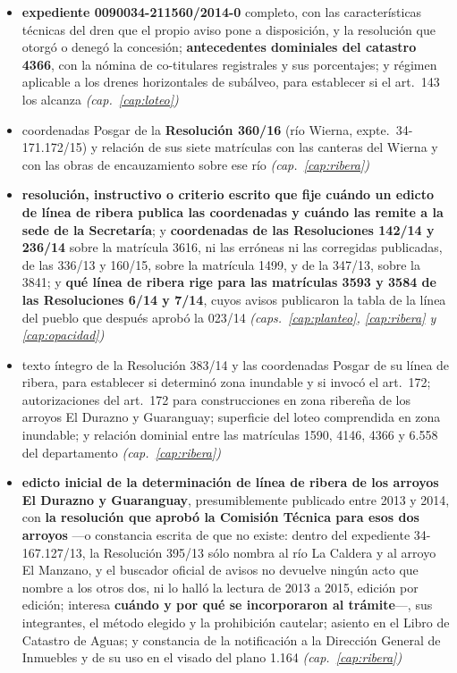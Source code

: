 \begin{itemize}[leftmargin=*]
\item \textbf{expediente 0090034-211560/2014-0} completo, con las características técnicas del dren que el propio aviso pone a disposición, y la resolución que otorgó o denegó la concesión; \textbf{antecedentes dominiales del catastro 4366}, con la nómina de co-titulares registrales y sus porcentajes; y régimen aplicable a los drenes horizontales de subálveo, para establecer si el art.\ 143 los alcanza \textit{(cap.\ \ref{cap:loteo})}
\item coordenadas Posgar de la \textbf{Resolución 360/16} (río Wierna, expte.\ 34-171.172/15) y relación de sus siete matrículas con las canteras del Wierna y con las obras de encauzamiento sobre ese río \textit{(cap.\ \ref{cap:ribera})}
\item \textbf{resolución, instructivo o criterio escrito que fije cuándo un edicto de línea de ribera publica las coordenadas y cuándo las remite a la sede de la Secretaría}; y \textbf{coordenadas de las Resoluciones 142/14 y 236/14} sobre la matrícula 3616, ni las erróneas ni las corregidas publicadas, de las 336/13 y 160/15, sobre la matrícula 1499, y de la 347/13, sobre la 3841; y \textbf{qué línea de ribera rige para las matrículas 3593 y 3584 de las Resoluciones 6/14 y 7/14}, cuyos avisos publicaron la tabla de la línea del pueblo que después aprobó la 023/14 \textit{(caps.\ \ref{cap:planteo}, \ref{cap:ribera} y \ref{cap:opacidad})}
\item texto íntegro de la Resolución 383/14 y las coordenadas Posgar de su línea de ribera, para establecer si determinó zona inundable y si invocó el art.\ 172; autorizaciones del art.\ 172 para construcciones en zona ribereña de los arroyos El Durazno y Guaranguay; superficie del loteo comprendida en zona inundable; y relación dominial entre las matrículas 1590, 4146, 4366 y 6.558 del departamento \textit{(cap.\ \ref{cap:ribera})}
\item \textbf{edicto inicial de la determinación de línea de ribera de los arroyos El Durazno y Guaranguay}, presumiblemente publicado entre 2013 y 2014, con \textbf{la resolución que aprobó la Comisión Técnica para esos dos arroyos} ---o constancia escrita de que no existe: dentro del expediente 34-167.127/13, la Resolución 395/13 sólo nombra al río La Caldera y al arroyo El Manzano, y el buscador oficial de avisos no devuelve ningún acto que nombre a los otros dos, ni lo halló la lectura de 2013 a 2015, edición por edición; interesa \textbf{cuándo y por qué se incorporaron al trámite}---, sus integrantes, el método elegido y la prohibición cautelar; asiento en el Libro de Catastro de Aguas; y constancia de la notificación a la Dirección General de Inmuebles y de su uso en el visado del plano 1.164 \textit{(cap.\ \ref{cap:ribera})}

\end{itemize}
